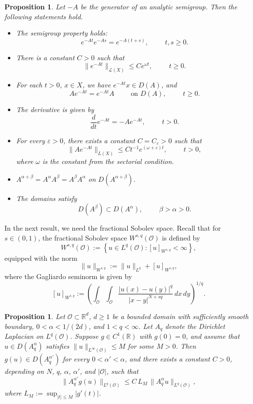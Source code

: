 \documentclass[10pt]{article}
\numberwithin{figure}{section}
\numberwithin{equation}{section}
\newtheorem{proposition}[theorem]{Proposition}
\newcommand{\0}{{\theta}}
\def\Hs{\hspace{1cm}}\def\hs{\hspace{0.5cm}}
\def\Vs{\vskip8pt}\def\vs{\vskip4pt}
\begin{document}
\begin{proposition}\label{p2}
Let $-A$ be the generator of an analytic semigroup. Then the following statements hold.
\begin{itemize}
    \item The semigroup property holds:
    $$
    e^{-A t}e^{-A s} = e^{-A(t+s)}, \Hs t, s \geq 0.
    $$
    \item There is a constant $C>0$ such that 
    $$
    \|e^{-At}\|_{\mathcal{L}(X)}\le C e^{\omega t},\Hs t\ge0.
    $$
    \item For each $t > 0$, $x \in X$, we have $e^{-At}x \in D(A)$, and 
    $$
    A e^{-At}=e^{-At}A\Hs \text{on } D(A),\Hs t\ge0.
    $$
    \item The derivative is given by
    $$
    \frac{d}{dt} e^{-At} = -A e^{-At}, \Hs t > 0.
    $$
    \item For every $\varepsilon > 0$, there exists a constant $C=C_{\varepsilon} > 0$ such that
    $$
    \|A e^{-A t}\|_{L(X)} \leq C t^{-1}e^{(\omega + \varepsilon)t}, \Hs t > 0,
    $$
    where $\omega$ is the constant from the sectorial condition.

    \item $A^{\alpha+\beta}=A^\alpha A^\beta=A^\beta A^\alpha$ on $D(A^{\alpha+\beta})$.
   \item The domains satisfy
    $$
    D(A^\beta)\subset D(A^\alpha),\Hs \beta>\alpha>0.
    $$
\end{itemize}
\end{proposition}
\Vs
In the next result, we need the fractional Sobolev space. Recall that for $s \in (0,1)$, the fractional Sobolev space $W^{s,q}(\mathcal O)$ is defined by
$$
W^{s,q}(\mathcal O)
:= \left\{
u \in L^q(\mathcal O) :
[u]_{W^{s,q}} < \infty
\right\},
$$
equipped with the norm
$$
\|u\|_{W^{s,q}}
:= \|u\|_{L^q} + [u]_{W^{s,q}},
$$
where the Gagliardo seminorm is given by
$$
[u]_{W^{s,q}}
:= \left(
\int_{\mathcal O}\int_{\mathcal O}
\frac{|u(x) - u(y)|^q}{|x - y|^{N + sq}}
\,dx\,dy
\right)^{1/q}.
$$
\begin{proposition}
\label{prop:sigma-W2aq}
Let $\mathcal{O} \subset \mathbb{R}^d$, $d\ge1$ be a bounded domain with sufficiently smooth boundary,
$0 < \alpha < 1/(2d)$, and $1 < q < \infty$.
Let $A_q$ denote the Dirichlet Laplacian on $L^q(\mathcal{O})$.
Suppose $g \in C^1(\mathbb{R})$ with $g(0) = 0$, and assume that $u \in D(A_q^\alpha)$
satisfies $\|u\|_{L^\infty(\mathcal{O})} \le M$ for some $M > 0$.
Then $g(u) \in D(A_q^{\alpha'})$ for every $0 < \alpha' < \alpha$, and there exists a constant
$C > 0$, depending on $N$, $q$, $\alpha$, $\alpha'$, and $|\mathcal{O}|$, such that
\begin{equation}
\label{eq:main-estimate}
\|A_q^{\alpha'} g(u)\|_{L^q(\mathcal{O})}
\le C\,L_M\,\|A_q^\alpha u\|_{L^q(\mathcal{O})},
\end{equation}
where $L_M := \sup_{|t| \le M} |g'(t)|$.
\end{proposition}
\end{document}
